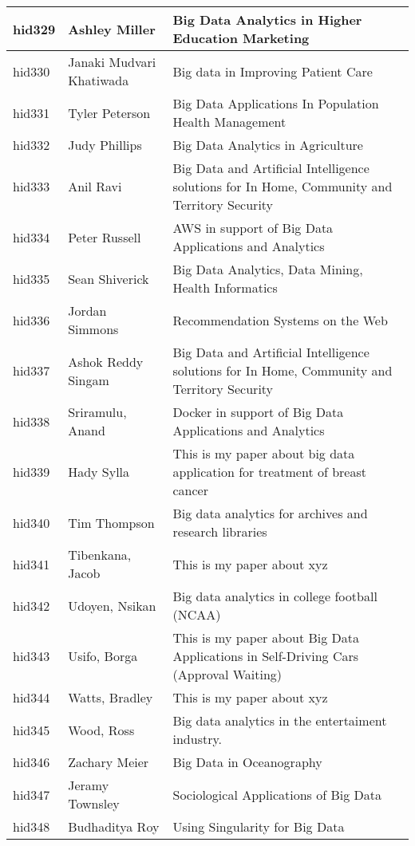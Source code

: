 \documentclass[12pt]{article}
\begin{document}
\begin{footnotesize}
\begin{longtable}{|p{1cm}p{5cm}p{9cm}|}
\hline
hid329 & Ashley Miller & Big Data Analytics in Higher Education Marketing  \\
\hline
hid330 & Janaki Mudvari Khatiwada & Big data in Improving Patient Care  \\
\hline
hid331 & Tyler Peterson & Big Data Applications In Population Health Management  \\
\hline
hid332 & Judy Phillips & Big Data Analytics in Agriculture  \\
\hline
hid333 & Anil Ravi & Big Data and Artificial Intelligence solutions for In Home, Community and Territory Security  \\
\hline
hid334 & Peter Russell & AWS in support of Big Data Applications and Analytics  \\
\hline
hid335 & Sean Shiverick & Big Data Analytics, Data Mining, Health Informatics  \\
\hline
hid336 & Jordan Simmons & Recommendation Systems on the Web  \\
\hline
hid337 & Ashok Reddy Singam & Big Data and Artificial Intelligence solutions for In Home, Community and Territory Security  \\
\hline
hid338 & Sriramulu, Anand & Docker in support of Big Data Applications and Analytics  \\
\hline
hid339 & Hady Sylla & This is my paper about big data application for treatment of breast cancer  \\
\hline
hid340 & Tim Thompson & Big data analytics for archives and research libraries  \\
\hline
hid341 & Tibenkana, Jacob & This is my paper about xyz  \\
\hline
hid342 & Udoyen, Nsikan & Big data analytics in college football (NCAA)  \\
\hline
hid343 & Usifo, Borga & This is my paper about Big Data Applications in Self-Driving Cars (Approval Waiting)  \\
\hline
hid344 & Watts, Bradley & This is my paper about xyz  \\
\hline
hid345 & Wood, Ross & Big data analytics in the entertaiment industry.  \\
\hline
hid346 & Zachary Meier & Big Data in Oceanography  \\
\hline
hid347 & Jeramy Townsley & Sociological Applications of Big Data  \\
\hline
hid348 & Budhaditya Roy & Using Singularity for Big Data  \\
\hline
\end{longtable}
\end{footnotesize}
\newpage
\end{document}
